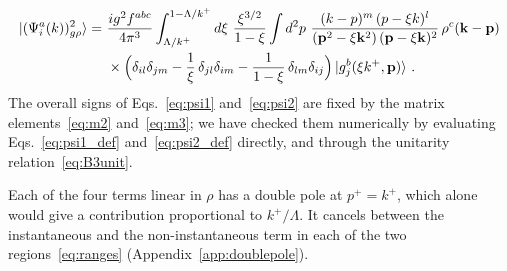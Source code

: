 \begin{align}\label{eq:psi2_xi}
\ket{(\Psi^a_i(k))^2_{g\rho}}=\ &\frac{ig^2f^{abc}}{4\pi^3}\int_{\Lambda/k^+}^{1-\Lambda/k^+}d\xi\ \frac{\xi^{3/2}}{1-\xi}\int d^2p\ \frac{(k-p)^m\,(p-\xi k)^l}{(\v p^2-\xi\v k^2)\,(\v p-\xi\v k)^2}\,\rho^c(\v k-\v p)\notag\\
&\times\Big(\delta_{il}\delta_{jm}-\frac1\xi\,\delta_{jl}\delta_{im}-\frac{1}{1-\xi}\,\delta_{lm}\delta_{ij}\Big)\ket{g^b_j(\xi k^+,\v p)}\,.
\end{align}
The overall signs of Eqs.~\eqref{eq:psi1} and~\eqref{eq:psi2} are fixed by the matrix elements~\eqref{eq:m2} and~\eqref{eq:m3}; we have checked them numerically by evaluating Eqs.~\eqref{eq:psi1_def} and~\eqref{eq:psi2_def} directly, and through the unitarity relation~\eqref{eq:B3unit}.

Each of the four terms linear in $\rho$ has a double pole at $p^+=k^+$, which alone would give a contribution proportional to $k^+/\Lambda$. It cancels between the instantaneous and the non-instantaneous term in each of the two regions~\eqref{eq:ranges} (Appendix~\ref{app:doublepole}).

